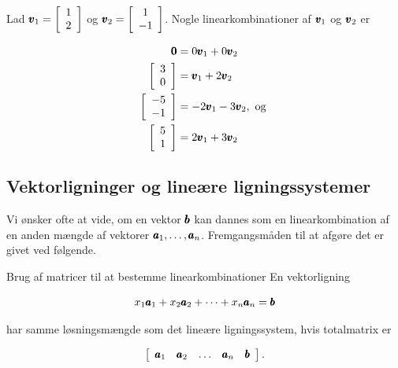 \begin{example}
    Lad $\pmb{v}_1 = \left[\begin{array}{l}
        1 \\
        2
        \end{array}\right]$ og $\pmb{v}_2 = \left[\begin{array}{c}
        1 \\
        -1
        \end{array}\right]$. Nogle linearkombinationer af $\pmb{v}_1$ og $\pmb{v}_2$ er
        
        \[
        \begin{aligned}
        \pmb{0} & = 0 \pmb{v}_1 + 0 \pmb{v}_2 \\
        {\left[\begin{array}{l}
        3 \\
        0
        \end{array}\right] } & = \pmb{v}_1 + 2 \pmb{v}_2 \\
        {\left[\begin{array}{l}
        -5 \\
        -1
        \end{array}\right] } & = -2 \pmb{v}_1 - 3 \pmb{v}_2, \text { og } \\
        {\left[\begin{array}{l}
        5 \\
        1
        \end{array}\right] } & = 2 \pmb{v}_1 + 3 \pmb{v}_2
        \end{aligned}
        \]
        
\end{example}

\subsection*{Vektorligninger og lineære ligningssystemer}

Vi ønsker ofte at vide, om en vektor $\pmb{b}$ kan dannes som en linearkombination af en anden mængde af vektorer $\pmb{a}_1, \ldots, \pmb{a}_n$. Fremgangsmåden til at afgøre det er givet ved følgende.

\begin{custombox}{Brug af matricer til at bestemme linearkombinationer}
En vektorligning

\[
x_1 \pmb{a}_1 + x_2 \pmb{a}_2 + \cdots + x_n \pmb{a}_n = \pmb{b}
\]

har samme løsningsmængde som det lineære ligningssystem, hvis totalmatrix er

\[
\left[\begin{array}{lllll}
\pmb{a}_1 & \pmb{a}_2 & \ldots & \pmb{a}_n & \pmb{b}
\end{array}\right].
\]    
\end{custombox}

